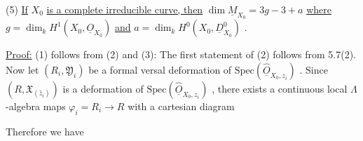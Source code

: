 
(5)  \underline{If} $X_0$ \underline{is a complete irreducible curve, then} $\dim \underline{M}_{X_0} = 3g - 3 + a$ \underline{where} $g = \dim_k H^1(X_0, \underline{O}_{X_0})$ \underline{and} $a = \dim_k H^0(X_0, \underline{D}^0_{X_0})$ .

\underline{Proof:}  (1) follows from (2) and (3): The first statement of (2) follows from 5.7(2). Now let $(R_i, \mathfrak{Y}_i)$ be a formal versal deformation of $\mathrm{Spec}(\hat{\underline{O}}_{X_0,z_i})$ . Since $(R, \mathfrak{X}_{(\widehat{z}_i)})$ is a deformation of $\mathrm{Spec}(\hat{\underline{O}}_{X_0,z_i})$ , there exists a continuous local $\Lambda$-algebra maps $\varphi_i = R_i \to R$ with a cartesian diagram

\begin{center}
\end{center}
Therefore we have

